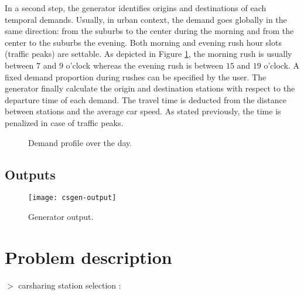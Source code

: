 \begin{bibunit}[ieeetr]
\medskip
In a second step, the generator identifies origins and destinations of each temporal demands.
Usually, in urban context, the demand goes globally in the same direction: from the suburbs to the center during the morning and from the center to the suburbs the evening.
Both morning and evening rush hour slots (traffic peaks) are settable.
As depicted in Figure \ref{fig:plotDemandProfile}, the morning rush is usually between $7$ and $9$ o'clock whereas the evening rush is between $15$ and $19$ o'clock.
A fixed demand proportion during rushes can be specified by the user.
The generator finally calculate the origin and destination stations with respect to the departure time of each demand.
The travel time is deducted from the distance between stations and the average car speed.
As stated previously, the time is penalized in case of traffic peaks.


\begin{figure}[t]
\centering

\caption{Demand profile over the day.}
\label{fig:plotDemandProfile}
\end{figure}


\subsection{Outputs}

\begin{figure}[!h]
\centering
\texttt{[image: csgen-output]}
\caption{Generator output.}
\label{fig_randomStationPositioning}
\end{figure}







\newpage
\section{Problem description}
$>$ carsharing station selection : \cite{ion_site_2009}


\end{bibunit}
